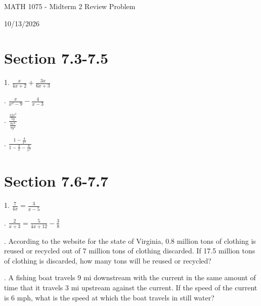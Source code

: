 \documentclass[12pt]{article}
\begin{document}
\vspace*{0.5in}

\begin{center}
    {\LARGE MATH 1075 - Midterm 2 Review Problem}

    \vspace{2em}

    {\large 10/13/2026}
\end{center}
\section{Section 7.3-7.5}
\vspace{1.5em}

1. $\frac{x}{4x+2}+\frac{3x}{6x+3}  $

\vspace{5.5em}

. $\frac{x}{x^{2}-9}-\frac{4}{x-3}  $

\vspace{5.5em}

. $\frac{\frac{12x^{2}}{5y} }{\frac{8x^{6}}{9y^{2}} } $

\vspace{5.5em}

. $\frac{1-\frac{4}{x^{2}} }{1-\frac{2}{x}-\frac{8}{x^{2}}}{} $

\newpage 
\section{Section 7.6-7.7}
1. $\frac{7}{4x}=\frac{3}{x-5}  $

\vspace{4.5em}

. $\frac{2}{x+3}=\frac{5}{4x+12}-\frac{3}{8}   $

\vspace{7.5em}

. According to the website for the state of Virginia, 0.8 million tons of clothing is reused or recycled out of 7 million tons of clothing discarded. If 17.5 million tons of clothing is discarded, how many tons will be reused or recycled?

\vspace{18em}

. A fishing boat travels 9 mi downstream with the current in the same amount of time that it travels 3 mi upstream against the current. If the speed of the current is 6 mph, what is the speed at which the boat travels in still water?
\newpage
\end{document}
